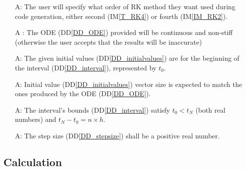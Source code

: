 \documentclass[12pt]{article}
\newcommand{\ddref}[1]{DD\ref{#1}}
\newcounter{assumpnum} %
\newcommand{\iref}[1]{IM\ref{#1}}
\begin{document}
\begin{itemize}

\item[A\refstepcounter{assumpnum}\theassumpnum \label{A_RKorder}:] The user 
will specify what order of RK method they want used during code generation, 
either second (\iref{T_RK4}) or fourth (\iref{IM_RK2}). 

\item[A\refstepcounter{assumpnum}\theassumpnum 
\label{A_ODEnonstiffcontinuous}:] The ODE (\ddref{DD_ODE}) provided will be 
continuous and 
non-stiff (otherwise the user accepts that the results will be inaccurate)

\item[A\refstepcounter{assumpnum}\theassumpnum \label{A_initialvaluesata}:] The 
given initial values (\ddref{DD_initialvalues}) are for the beginning of the 
interval (\ddref{DD_interval}), represented by $t_0$. 

\item[A\refstepcounter{assumpnum}\theassumpnum \label{A_initialvalues}:] 
Initial value (\ddref{DD_initialvalues}) vector size is expected to match the 
ones produced by the ODE 
(\ddref{DD_ODE}).

\item[A\refstepcounter{assumpnum}\theassumpnum \label{A_interval}:] The 
interval's bounds (\ddref{DD_interval}) satisfy $t_0 < t_N$ (both real 
numbers) and $t_N - t_0 = n 
\times h$. 

\item[A\refstepcounter{assumpnum}\theassumpnum \label{A_stepsize}:] The step 
size (\ddref{DD_stepsize}) shall be a positive real number. 

\end{itemize}


\subsection{Calculation} \label{sec_Calculation}
\end{document}
